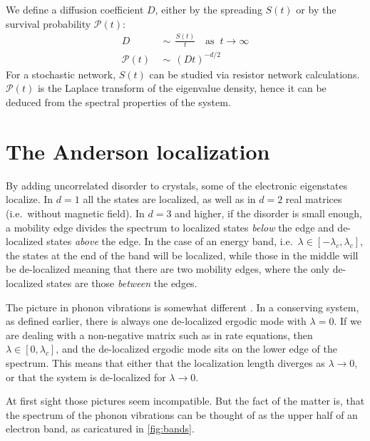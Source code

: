 We define a diffusion coefficient $D$, either by the spreading $S(t)$
or by the survival probability $\mathcal{P}(t)$:
%
\begin{align}
D\ \ &\sim\ \ \frac{S(t)}{t}  \quad \textrm{as }\ t\rightarrow\infty \\
\mathcal{P}(t)\ \ &\sim\ \ (Dt)^{-d/2}
\end{align}
%
For a stochastic network, $S(t)$ can be studied via resistor network 
calculations. $\mathcal{P}(t)$ is the Laplace transform of the 
eigenvalue density, hence it can be deduced from the spectral properties of the 
system. 
%


\section{The Anderson localization}\label{sec:anderson}

By adding uncorrelated disorder to crystals, some of the electronic eigenstates 
localize\cite{anderson_absence_1958,mott_mobility_1987,thouless_electrons_1974}. In  $d=1$ all the states are localized, as well as in $d=2$ real matrices 
(i.e.\ without magnetic field). In $d=3$ and higher, if the disorder
is small enough, a mobility edge divides the spectrum to localized states \emph{below} the edge and 
de-localized states \emph{above} the edge. In the case of an energy band, i.e.\ $\lambda\in [-\lambda_c,\lambda_c]$,
the states at the end of the band will be localized, while those in the middle
will be de-localized meaning that there are two mobility edges,
where the only de-localized states are those \emph{between} the edges.


The picture in phonon vibrations is somewhat different
\cite{tong_wave_1999,reuveni_anomalies_2010,granek_fractons_2005,ishii_localization_1973,lepri_thermal_2001,kantelhardt_extended_1998,amir_localization_2010}. 
In a conserving
system, as defined earlier, there is always one de-localized ergodic mode with $\lambda=0$.
If we are dealing with a non-negative matrix such as in rate equations, 
then $\lambda \in [0,\lambda_c]$, and the de-localized ergodic mode
sits on the lower edge of the spectrum. This means that either that the localization 
length diverges as $\lambda\rightarrow 0$, or that the system is de-localized for
$\lambda\rightarrow 0$.


At first sight those pictures seem incompatible. But the fact 
of the matter is, that the spectrum of the phonon vibrations
can be thought of as the upper half of an electron band, as caricatured in \autoref{fig:bands}.



